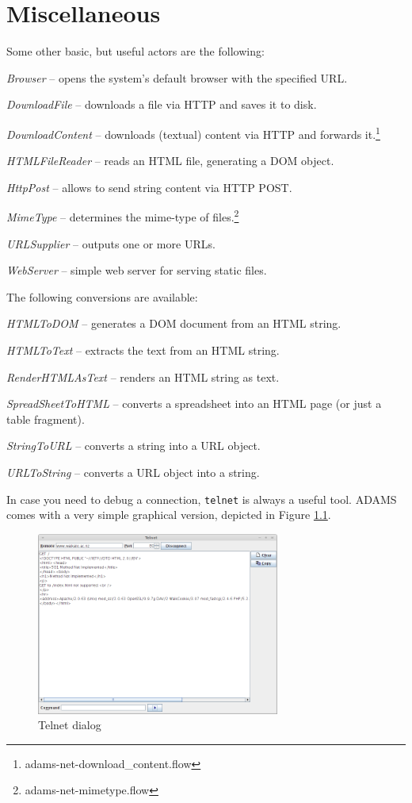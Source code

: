 \documentclass[a4paper]{book}
\begin{document}
\chapter{Miscellaneous}
Some other basic, but useful actors are the following:
\begin{tight_itemize}
	\item \textit{Browser} -- opens the system's default browser with the specified
	URL.
	\item \textit{DownloadFile} -- downloads a file via HTTP and saves it to disk.
	\item \textit{DownloadContent} -- downloads (textual) content via HTTP and 
	forwards it.\footnote{adams-net-download\_content.flow}
	\item \textit{HTMLFileReader} -- reads an HTML file, generating a DOM object.
	\item \textit{HttpPost} -- allows to send string content via HTTP POST.
	\item \textit{MimeType} -- determines the mime-type of 
	files.\footnote{adams-net-mimetype.flow}
	\item \textit{URLSupplier} -- outputs one or more URLs.
	\item \textit{WebServer} -- simple web server for serving static files.
\end{tight_itemize}
The following conversions are available:
\begin{tight_itemize}
    \item \textit{HTMLToDOM} -- generates a DOM document from an HTML string.
    \item \textit{HTMLToText} -- extracts the text from an HTML string.
    \item \textit{RenderHTMLAsText} -- renders an HTML string as text.
	\item \textit{SpreadSheetToHTML} -- converts a spreadsheet into an HTML 
	page (or just a table fragment).
	\item \textit{StringToURL} -- converts a string into a URL object.
	\item \textit{URLToString} -- converts a URL object into a string.
\end{tight_itemize}
In case you need to debug a connection, \texttt{telnet} is always a useful tool.
ADAMS comes with a very simple graphical version, depicted in Figure \ref{telnet}.
\begin{figure}[htb]
  \centering
  \includegraphics[width=8.0cm]{images/telnet.png}
  \caption{Telnet dialog}
  \label{telnet}
\end{figure}



\end{document}

